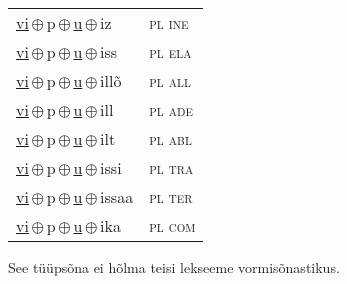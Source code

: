 \begin{minipage}{\textwidth}
\begin{sideways}
\begin{tabular}{l l}
\underline{vi}\,$\oplus$\,p\,$\oplus$\,\underline{u}\,$\oplus$\,iz & \textsc{ pl ine } \\
\underline{vi}\,$\oplus$\,p\,$\oplus$\,\underline{u}\,$\oplus$\,iss & \textsc{ pl ela } \\
\underline{vi}\,$\oplus$\,p\,$\oplus$\,\underline{u}\,$\oplus$\,illõ & \textsc{ pl all } \\
\underline{vi}\,$\oplus$\,p\,$\oplus$\,\underline{u}\,$\oplus$\,ill & \textsc{ pl ade } \\
\underline{vi}\,$\oplus$\,p\,$\oplus$\,\underline{u}\,$\oplus$\,ilt & \textsc{ pl abl } \\
\underline{vi}\,$\oplus$\,p\,$\oplus$\,\underline{u}\,$\oplus$\,issi & \textsc{ pl tra } \\
\underline{vi}\,$\oplus$\,p\,$\oplus$\,\underline{u}\,$\oplus$\,issaa & \textsc{ pl ter } \\
\underline{vi}\,$\oplus$\,p\,$\oplus$\,\underline{u}\,$\oplus$\,ika & \textsc{ pl com } \\
\end{tabular}
\end{sideways}
\label{tab:tüüpsõnamall-vipu}

\end{minipage}

 
\vspace{1em}
\noindent See tüüpsõna ei hõlma teisi lekseeme vormi\-sõnastikus.
